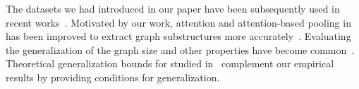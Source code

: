 The datasets we had introduced in our paper have been subsequently used in recent works~\citep{dwivedi2020benchmarking,vincent2021online,ma2020adaptive,wang2020haar}. Motivated by our work, attention and attention-based pooling in \gnns has been improved to extract graph substructures more accurately~\citep{kim2020find,wang2020haar,ji2020hopgat}.
Evaluating the generalization of \gnns \wrt the graph size and other properties have become common~\citep{velivckovic2019neural,verma2019stability,sinha2020evaluating}.
Theoretical generalization bounds for \gnns studied in~\citep{garg2020generalization} complement our empirical results by providing conditions for \gnns generalization.

